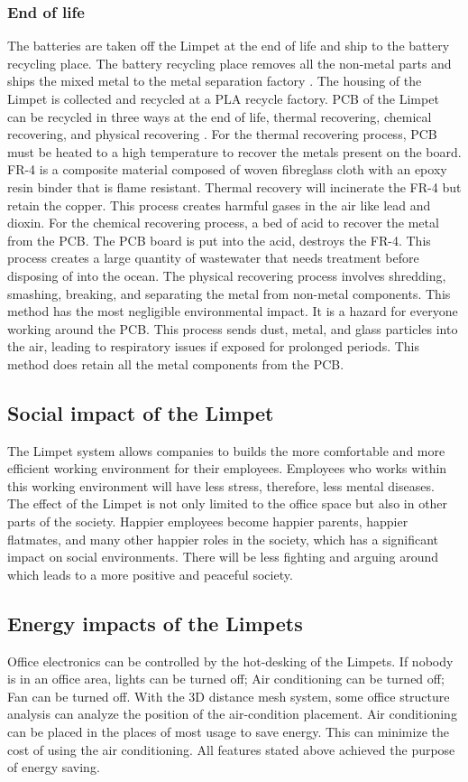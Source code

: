 \subsubsection*{End of life}
The batteries are taken off the Limpet at the end of life and ship to the battery recycling
place. The battery recycling place removes all the non-metal parts and ships the mixed
metal to the metal separation factory \cite{sus_eol_1}. The housing of the Limpet is collected and
recycled at a PLA recycle factory. PCB of the Limpet can be recycled in three ways at the end
of life, thermal recovering, chemical recovering, and physical recovering \cite{sus_eol_2}.
For the thermal recovering process, PCB must be heated to a high temperature to recover
the metals present on the board. FR-4 is a composite material composed of woven fibreglass
cloth with an epoxy resin binder that is flame resistant. Thermal recovery will incinerate the
FR-4 but retain the copper. This process creates harmful gases in the air like lead and dioxin.
For the chemical recovering process, a bed of acid to recover the metal from the PCB. The
PCB board is put into the acid, destroys the FR-4. This process creates a large quantity of
wastewater that needs treatment before disposing of into the ocean.
The physical recovering process involves shredding, smashing, breaking, and separating the
metal from non-metal components. This method has the most negligible environmental
impact. It is a hazard for everyone working around the PCB. This process sends dust, metal,
and glass particles into the air, leading to respiratory issues if exposed for prolonged periods.
This method does retain all the metal components from the PCB.

\subsection*{Social impact of the Limpet }
The Limpet system allows companies to builds the more comfortable and more efficient working environment for their employees. Employees who works within this working environment will have less stress, therefore, less mental diseases.\\

The effect of the Limpet is not only limited to the office space but also in other parts of the society. Happier employees become happier parents, happier flatmates, and many other happier roles in the society, which has a significant impact on social environments. There will be less fighting and arguing around which leads to a more positive and peaceful society. 

\subsection*{Energy impacts of the Limpets }
Office electronics can be controlled by the hot-desking of the Limpets. If nobody is in an office area, lights can be turned off; Air conditioning can be turned off; Fan can be turned off. With the 3D distance mesh system, some office structure analysis can analyze the position of the air-condition placement. Air conditioning can be placed in the places of most usage to save energy. This can minimize the cost of using the air conditioning. All features stated above achieved the purpose of energy saving.
